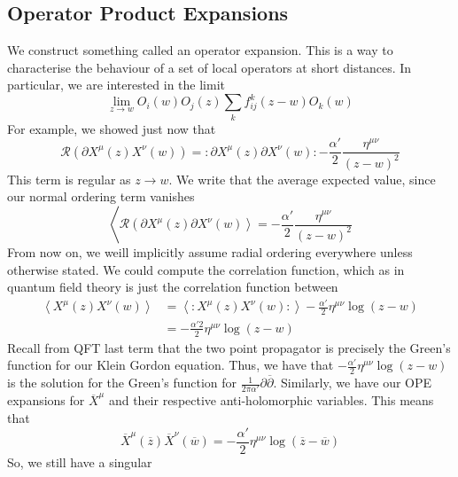 \documentclass[11pt, oneside]{article}   	%
\theoremstyle{slanted}
\begin{document}
 \subsection{Operator Product Expansions}
 We construct something called an 
 operator expansion.
 This is a way to characterise the 
 behaviour of a set of local 
 operators at short distances. 
 In particular, 
 we are interested in the limit 
 \[
	 \lim_{ z \to w } O _ i \left( w  \right)  
	 O _ j  \left( z \right)  \sum_ k f_{ij } ^ k \left( z - w  \right)  O _ k \left( w  \right)  
 \] For example, we showed 
 just now that 
 \[
	 \mathcal{ R } \left( \partial  X ^ \mu \left(  z  \right)  X ^ \nu \left(  w  \right)   \right)  
	 = : \partial X ^ \mu \left(  z  \right)  \partial X ^ \nu \left(  w  \right)  : 
	 - \frac{\alpha' }{  2  } \frac{\eta ^{ \mu \nu } }{ \left(  z -w  \right)  ^ 2 } 
 \] This term 
 is regular as $ z \to w $. 
 We write that the average 
 expected value, since our normal ordering term vanishes
 \[
	 \left< \mathcal{ R } \left(\partial  X^ \mu 
		 \left(  z  \right)  \partial  X ^ \nu \left( w  \right)  \right>
		 =  - \frac{\alpha'  }{ 2 } \frac{\eta ^{ \mu \nu } }{ \left( 
		 z - w \right)  ^ 2 } 
 \]  From now on, we weill 
 implicitly assume radial ordering everywhere unless otherwise stated. 
We could compute the correlation 
function, which as in quantum field theory is just the
correlation function between 
\begin{align*}
	\left< X ^ \mu \left(  z  \right)  X ^ \nu \left(  w  \right)   \right> 
	&= \left< : X ^ \mu \left( z  \right)  X^ \nu \left(  w  \right)  :\right> 
	- \frac{\alpha'}{2}  \eta ^{\mu \nu } \log \left(  z - w  \right)  \\
	&=   - \frac{\alpha'  2 }{ 2 } \eta ^{ \mu \nu } \log \left( z - w   \right) 
 \end{align*}
 Recall from QFT last term that the two point 
 propagator is 
 precisely the Green's function for 
 our Klein Gordon equation. Thus, we have 
 that $ - \frac{\alpha'  }{ 2 } \eta ^{ \mu \nu } \log \left( z - w  \right)   $ 
 is the solution for the Green's function for $ \frac{1}{ 2 \pi \alpha'  } \partial  
 \overline{ \partial    } $. Similarly, we 
 have our OPE expansions for $ \overline{  X }^ \mu  $ 
 and their respective anti-holomorphic variables. 
 This means that 
 \[
	 \overline{  X} ^ \mu \left( \overline{ z }   \right)  
	 \overline{  X} ^ \nu \left( \overline{ w }  \right)  = - \frac{\alpha' }{  2 } 
	 \eta ^{ \mu \nu } \log \left( \overline{ z } - \overline{ w }  \right) 
 \]  So, we still have a singular 
\end{document}
